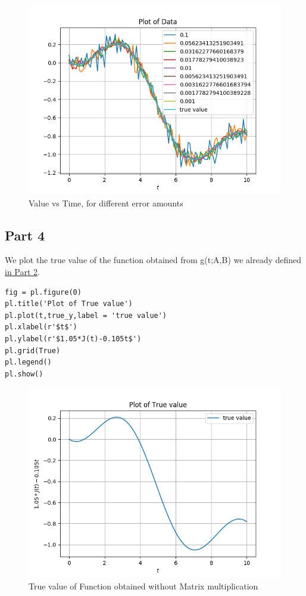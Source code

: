 \documentclass[11pt, a4paper]{article}
\begin{document}
\begin{figure}[!htb]
   	\centering
   	\includegraphics[scale=0.5]{dataplot.png}
   	\caption{Value vs Time, for different error amounts}
   	\label{fig:dataplot}
\end{figure} 

\subsection{Part 4}
We plot the true value of the function obtained from g(t;A,B) we already defined \hyperlink{g}{in Part 2}.
\begin{verbatim}
fig = pl.figure(0)
pl.title('Plot of True value')
pl.plot(t,true_y,label = 'true value') 
pl.xlabel(r'$t$')
pl.ylabel(r'$1.05*J(t)-0.105t$')
pl.grid(True)
pl.legend()
pl.show()
\end{verbatim}
\begin{figure}[!htb]
   	\centering
   	\includegraphics[scale=0.5]{truevalue.png}
   	\caption{True value of Function obtained without Matrix multiplication}
   	\label{fig:truevalue}
\end{figure}
   
\end{document}
